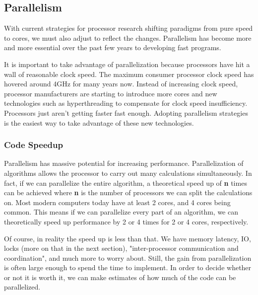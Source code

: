 \documentclass[letterpaper, 12pt]{article}
\begin{document}
\subsection{Parallelism}
With current strategies for processor research shifting paradigms from pure speed to cores,
we must also adjust to reflect the changes. Parallelism has become more and more essential
over the past few years to developing fast programs.

\par\vspace{\baselineskip}

It is important to take advantage of parallelization because processors have hit a wall of
reasonable clock speed\citep{processorspeed}. The maximum consumer processor clock speed has
hovered around 4GHz for many years now. Instead of increasing clock speed, processor
manufacturers are starting to introduce more cores and new technologies such as hyperthreading
to compensate for clock speed insufficiency. Processors just aren't getting faster fast enough.
Adopting parallelism strategies is the easiest way to take advantage of these new technologies.

\subsubsection{Code Speedup}
Parallelism has massive potential for increasing performance. Parallelization of algorithms
allows the processor to carry out many calculations simultaneously. In fact, if we can
parallelize the entire algorithm, a theoretical speed up of {\bfseries n} times can be
achieved where {\bfseries n} is the number of processors we can split the calculations on.
Most modern computers today have at least 2 cores, and 4 cores being common. This means
if we can parallelize every part of an algorithm, we can theoretically speed up performance
by 2 or 4 times for 2 or 4 cores, respectively.

\par\vspace{\baselineskip}
Of course, in reality the speed up is less than that. We have memory latency, IO, locks
(more on that in the next section), "inter-processor communication and coordination"\citep[p. 13]{artofmulti},
and much more to worry about. Still, the gain from parallelization is often large enough to spend
the time to implement. In order to decide whether or not it is worth it, we can make estimates of
how much of the code can be parallelized.
\end{document}
